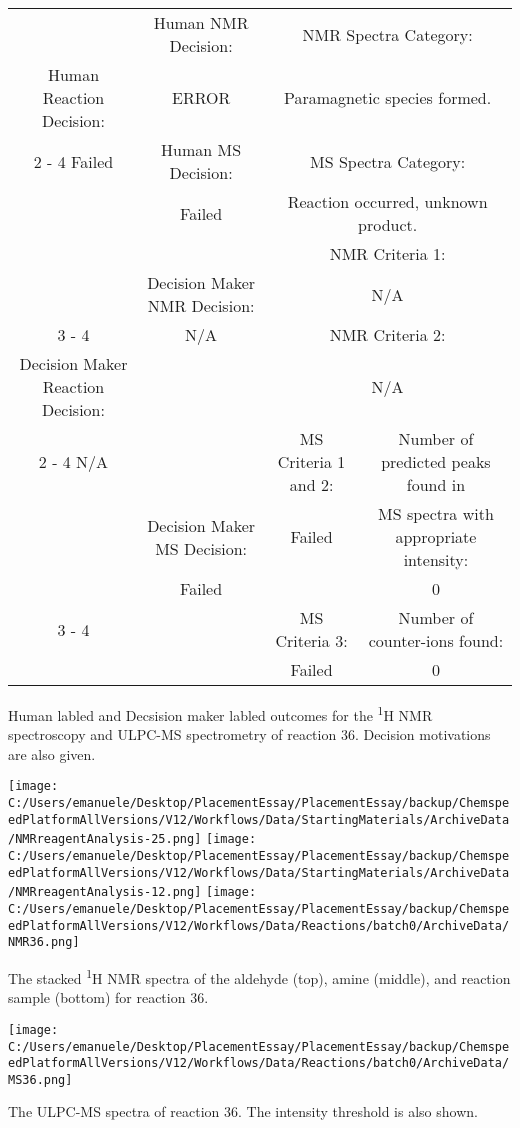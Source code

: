 \documentclass{article}%
\begin{document}
\begin{Decision Table}[H]%
\begin{tabular}{|c|c|c|c|}%
\hline%
&Human NMR Decision:&\multicolumn{2}{|c|}{NMR Spectra Category:}\\%
Human Reaction Decision:&ERROR&\multicolumn{2}{|c|}{Paramagnetic species formed.}\\%
\cline{2%
-%
4}%
Failed&Human MS Decision:&\multicolumn{2}{|c|}{MS Spectra Category:}\\%
&Failed&\multicolumn{2}{|c|}{Reaction occurred, unknown product.}\\%
\hline%
&&\multicolumn{2}{|c|}{NMR Criteria 1:}\\%
&Decision Maker NMR Decision:&\multicolumn{2}{|c|}{N/A}\\%
\cline{3%
-%
4}%
&N/A&\multicolumn{2}{|c|}{NMR Criteria 2:}\\%
Decision Maker Reaction Decision:&&\multicolumn{2}{|c|}{N/A}\\%
\cline{2%
-%
4}%
N/A&&MS Criteria 1 and 2:&Number of predicted peaks found in\\%
&Decision Maker MS Decision:&Failed&MS spectra with appropriate intensity:\\%
&Failed&&0\\%
\cline{3%
-%
4}%
&&MS Criteria 3:&Number of counter{-}ions found:\\%
&&Failed&0\\%
\hline%
\end{tabular}%
\caption{Human labled and Decsision maker labled outcomes for the \textsuperscript{1}H NMR spectroscopy and ULPC-MS spectrometry of reaction 36. Decision motivations are also given.}%
\end{Decision Table}%
\begin{NMR Spectra}[H]%
\begin{center}%
\texttt{[image: C:/Users/emanuele/Desktop/PlacementEssay/PlacementEssay/backup/ChemspeedPlatformAllVersions/V12/Workflows/Data/StartingMaterials/ArchiveData/NMRreagentAnalysis-25.png]}\hfill%
\texttt{[image: C:/Users/emanuele/Desktop/PlacementEssay/PlacementEssay/backup/ChemspeedPlatformAllVersions/V12/Workflows/Data/StartingMaterials/ArchiveData/NMRreagentAnalysis-12.png]}\hfill%
\texttt{[image: C:/Users/emanuele/Desktop/PlacementEssay/PlacementEssay/backup/ChemspeedPlatformAllVersions/V12/Workflows/Data/Reactions/batch0/ArchiveData/NMR36.png]}\hfill%
\end{center}%
\caption{The stacked \textsuperscript{1}H NMR spectra of the aldehyde (top), amine (middle), and reaction sample (bottom) for reaction 36.}%
\end{NMR Spectra}%
\begin{MS Spectra}[H]%
\begin{center}%
\texttt{[image: C:/Users/emanuele/Desktop/PlacementEssay/PlacementEssay/backup/ChemspeedPlatformAllVersions/V12/Workflows/Data/Reactions/batch0/ArchiveData/MS36.png]}\hfill%
\end{center}%
\caption{The ULPC-MS spectra of reaction 36. The intensity threshold is also shown.}%
\end{MS Spectra}%
\end{document}
